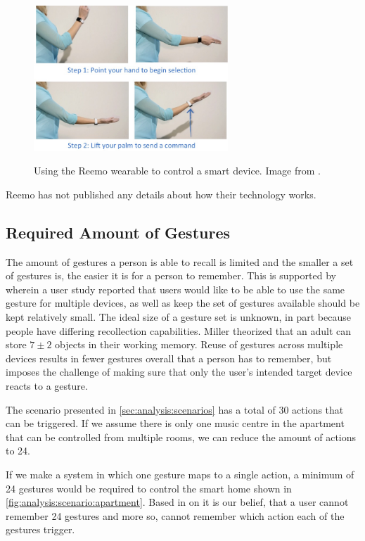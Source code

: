 \begin{figure}
\centering
\includegraphics[width=0.65\textwidth]{images/reemo}
\label{fig:introduction:gesture-control:reemo}
\caption{Using the Reemo wearable to control a smart device. Image from \cite{prespecialisation}.}
\end{figure}

Reemo has not published any details about how their technology works.

\subsection{Required Amount of Gestures}

The amount of gestures a person is able to recall is limited and the smaller a set of gestures is, the easier it is for a person to remember. This is supported by \cite{Kela2006} wherein a user study reported that users would like to be able to use the same gesture for multiple devices, as well as keep the set of gestures available should be kept relatively small.
The ideal size of a gesture set is unknown, in part because people have differing recollection capabilities. Miller \cite{miller1956magical} theorized that an adult can store $7 \pm 2$ objects in their working memory.
Reuse of gestures across multiple devices results in fewer gestures overall that a person has to remember, but imposes the challenge of making sure that only the user's intended target device reacts to a gesture.

The scenario presented in \cref{sec:analysis:scenarios} has a total of 30 actions that can be triggered. If we assume there is only one music centre in the apartment that can be controlled from multiple rooms, we can reduce the amount of actions to 24.

If we make a system in which one gesture maps to a single action, a minimum of 24 gestures would be required to control the smart home shown in \cref{fig:analysis:scenario:apartment}. Based in on \cite{Kela2006,miller1956magical} it is our belief, that a user cannot remember 24 gestures and more so, cannot remember which action each of the gestures trigger.

